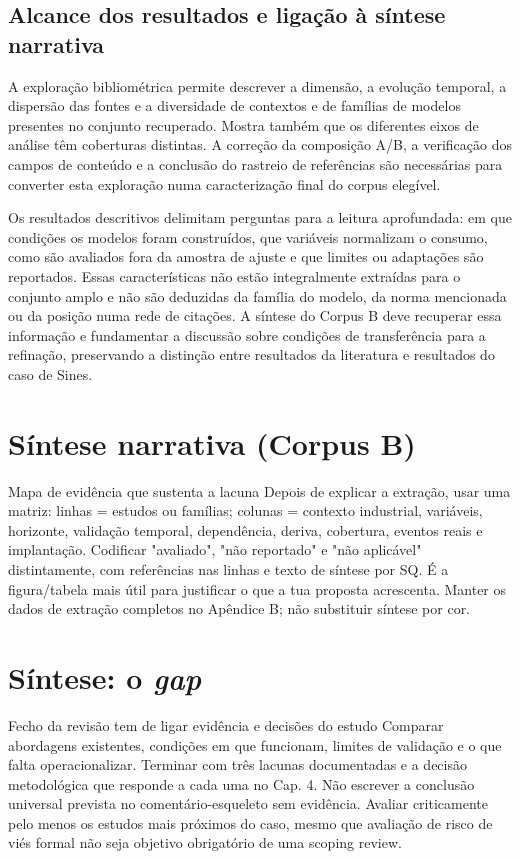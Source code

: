 \subsection{Alcance dos resultados e ligação à síntese narrativa}

A exploração bibliométrica permite descrever a dimensão, a
evolução temporal, a dispersão das fontes e a diversidade de
contextos e de famílias de modelos presentes no conjunto
recuperado. Mostra também que os diferentes eixos de análise
têm coberturas distintas. A correção da composição A/B, a
verificação dos campos de conteúdo e a conclusão do rastreio
de referências são necessárias para converter esta exploração
numa caracterização final do corpus elegível.

Os resultados descritivos delimitam perguntas para a leitura
aprofundada: em que condições os modelos foram construídos,
que variáveis normalizam o consumo, como são avaliados fora
da amostra de ajuste e que limites ou adaptações são reportados.
Essas características não estão integralmente extraídas para
o conjunto amplo e não são deduzidas da família do modelo,
da norma mencionada ou da posição numa rede de citações.
A síntese do Corpus B deve recuperar essa informação e
fundamentar a discussão sobre condições de transferência
para a refinação, preservando a distinção entre resultados
da literatura e resultados do caso de Sines.


\section{Síntese narrativa (Corpus B)}
\label{sec:corpus-b}
{Mapa de evidência que sustenta a lacuna}
{Depois de explicar a extração, usar uma matriz: linhas = estudos ou
famílias; colunas = contexto industrial, variáveis, horizonte, validação
temporal, dependência, deriva, cobertura, eventos reais e implantação.
Codificar "avaliado", "não reportado" e "não aplicável" distintamente,
com referências nas linhas e texto de síntese por SQ. É a figura/tabela
mais útil para justificar o que a tua proposta acrescenta. Manter os
dados de extração completos no Apêndice B; não substituir síntese por cor.}%



\section{Síntese: o \emph{gap}}
\label{sec:gap}
{Fecho da revisão tem de ligar evidência e decisões do estudo}
{Comparar abordagens existentes, condições em que funcionam, limites de
validação e o que falta operacionalizar. Terminar com três lacunas
documentadas e a decisão metodológica que responde a cada uma no Cap. 4.
Não escrever a conclusão universal prevista no comentário-esqueleto sem
evidência. Avaliar criticamente pelo menos os estudos mais próximos do
caso, mesmo que avaliação de risco de viés formal não seja objetivo
obrigatório de uma scoping review.}%


